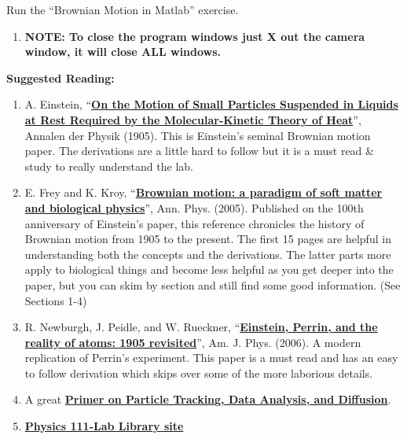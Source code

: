 \documentclass{../lab}
\begin{document}
Run the ``Brownian Motion in Matlab'' exercise.

\begin{enumerate}
    \item \textbf{NOTE: To close the program windows just X out the camera window, it will close ALL windows.}
\end{enumerate}

\textbf{Suggested Reading:}

\begin{enumerate}
    \item A. Einstein, ``\href{http://physics111.lib.berkeley.edu/Physics111/Reprints/BMC/Einstein\_Diffusion1905.pdf}{\textbf{On the Motion of Small Particles Suspended in Liquids at Rest Required by the Molecular-Kinetic Theory of Heat}}'', Annalen der Physik (1905). This is Einstein’s seminal Brownian motion paper. The derivations are a little hard to follow but it is a must read \& study to really understand the lab.

    \item E. Frey and K. Kroy, ``\href{http://physics111.lib.berkeley.edu/Physics111/Reprints/BMC/Brownian\%20Motion\%20-\%20Frey.pdf}{\textbf{Brownian motion: a paradigm of soft matter and biological physics}}'', Ann. Phys. (2005). Published on the 100th anniversary of Einstein’s paper, this reference chronicles the history of Brownian motion from 1905 to the present. The first 15 pages are helpful in understanding both the concepts and the derivations. The latter parts more apply to biological things and become less helpful as you get deeper into the paper, but you can skim by section and still find some good information. (See Sections 1-4)

    \item R. Newburgh, J. Peidle, and W. Rueckner, ``\href{http://physics111.lib.berkeley.edu/Physics111/Reprints/BMC/Newburgh-Einstein-Perrin1905_Revisited.pdf}{\textbf{Einstein, Perrin, and the reality of atoms: 1905 revisited}}'', Am. J. Phys. (2006). A modern replication of Perrin's experiment. This paper is a must read and has an easy to follow derivation which skips over some of the more laborious details.

    \item A great \href{http://www.physics.nyu.edu/grierlab/methods/methods.html}{\textbf{Primer on Particle Tracking, Data Analysis, and Diffusion}}.

    \item \href{\LabReprints}{\textbf{Physics 111-Lab Library site}}
\end{enumerate}
\end{document}
